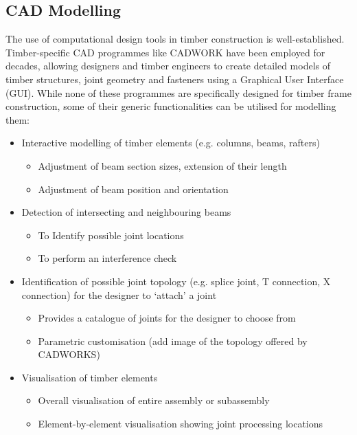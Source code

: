 \subsection{CAD Modelling}
The use of computational design tools in timber construction is well-established. Timber-specific CAD programmes like CADWORK have been employed for decades, allowing designers and timber engineers to create detailed models of timber structures, joint geometry and fasteners using a Graphical User Interface (GUI). 
While none of these programmes are specifically designed for timber frame construction, some of their generic functionalities can be utilised for modelling them:
    \begin{itemize}
    \item Interactive modelling of timber elements (e.g. columns, beams, rafters)
        \begin{itemize}
        \item Adjustment of beam section sizes, extension of their length
        \item Adjustment of beam position and orientation
        \end{itemize}
    \item Detection of intersecting and neighbouring beams
        \begin{itemize}
        \item To Identify possible joint locations
        \item To perform an interference check
        \end{itemize}
    \item Identification of possible joint topology (e.g. splice joint, T connection, X connection) for the designer to ‘attach’ a joint
        \begin{itemize}
        \item Provides a catalogue of joints for the designer to choose from
        \item Parametric customisation (add image of the topology offered by CADWORKS)
        \end{itemize}
     \item Visualisation of timber elements
        \begin{itemize}
        \item Overall visualisation of entire assembly or subassembly
        \item Element-by-element visualisation showing joint processing locations
        \end{itemize}
    \end{itemize}

